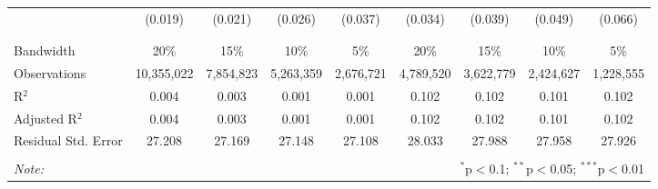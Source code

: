 \begin{table}[!htbp]
\begin{adjustbox}{scale = 0.9}
\begin{tabular}{@{\extracolsep{5pt}}lcccccccc}
  & (0.019) & (0.021) & (0.026) & (0.037) & (0.034) & (0.039) & (0.049) & (0.066) \\ 
  & & & & & & & & \\ 
\hline \\[-1.8ex] 
Bandwidth & 20\% & 15\% & 10\% & 5\% & 20\% & 15\% & 10\% & 5\% \\ 
Observations & 10,355,022 & 7,854,823 & 5,263,359 & 2,676,721 & 4,789,520 & 3,622,779 & 2,424,627 & 1,228,555 \\ 
R$^{2}$ & 0.004 & 0.003 & 0.001 & 0.001 & 0.102 & 0.102 & 0.101 & 0.102 \\ 
Adjusted R$^{2}$ & 0.004 & 0.003 & 0.001 & 0.001 & 0.102 & 0.102 & 0.101 & 0.102 \\ 
Residual Std. Error & 27.208 & 27.169 & 27.148 & 27.108 & 28.033 & 27.988 & 27.958 & 27.926 \\ 
\hline 
\hline \\[-1.8ex] 
\textit{Note:}  & \multicolumn{8}{r}{$^{*}$p$<$0.1; $^{**}$p$<$0.05; $^{***}$p$<$0.01} \\ 
\end{tabular}

\end{adjustbox}

\end{table}